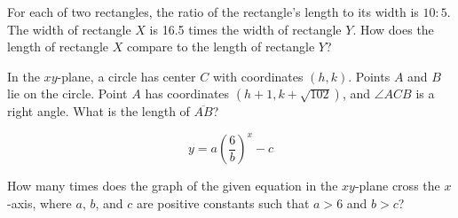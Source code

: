 \vspace{2em}
\newpage

\noindent\markforreview
\vspace{1em}

For each of two rectangles, the ratio of the rectangle's length to its width is \(10 : 5\).
The width of rectangle \(X\) is 16.5 times the width of rectangle \(Y\).
How does the length of rectangle \(X\) compare to the length of rectangle \(Y\)?

\vspace{0.75em}


\vspace{2em}
\newpage

\noindent\markforreview
\vspace{1em}

In the \(xy\)-plane, a circle has center \(C\) with coordinates \((h, k)\).
Points \(A\) and \(B\) lie on the circle. Point \(A\) has coordinates \((h + 1, k + \sqrt{102})\),
and \(\angle ACB\) is a right angle. What is the length of \(\overline{AB}\)?

\vspace{0.75em}


\vspace{2em}
\newpage

\noindent\markforreview
\vspace{1em}

\[
y = a\left(\frac{6}{b}\right)^{x} - c
\]

How many times does the graph of the given equation in the \(xy\)-plane cross the \(x\)-axis,
where \(a\), \(b\), and \(c\) are positive constants such that \(a > 6\) and \(b > c\)?

\vspace{0.75em}


\vspace{2em}
\newpage

